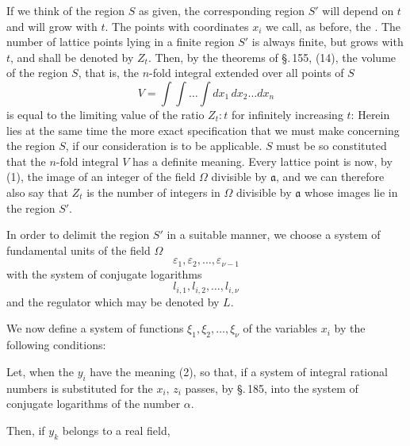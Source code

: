 If we think of the region $S$ as given, the corresponding
 region $S'$ will depend on $t$ and will grow with $t$.
The points with  coordinates $x_i$ we call,
as before, the . The number of lattice points
lying in a finite region $S'$ is always finite,
but grows with $t$, and shall be denoted by $Z_t$. Then, by
the theorems of \S.\,155, (14), the volume of the region $S$, that is, the
$n$-fold integral extended over all points of $S$
\[
V = \int\!\!\int \ldots \int dx_1\, dx_2 \ldots dx_n
\]
is equal to the limiting value of the ratio $Z_t : t$ for infinitely
increasing $t$:
Herein lies at the same time the more exact specification that we must
make concerning the region $S$, if our consideration is to be
 applicable. $S$ must be so constituted that the
$n$-fold integral $V$ has a definite meaning. Every lattice point
 is now, by (1), the image of an integer of the field $\Omega$ divisible
 by $\mathfrak{a}$, and we can therefore also say
that $Z_t$ is the number of integers in $\Omega$ divisible by $\mathfrak{a}$
whose images lie in the region $S'$.

In order to delimit the region $S'$ in a suitable manner, we choose
a system of fundamental units of the field $\Omega$
\[
\varepsilon_1, \varepsilon_2, \ldots, \varepsilon_{\nu-1}
\]
with the system of conjugate logarithms
\[
l_{i,1}, l_{i,2}, \ldots, l_{i,\nu}
\]
and the regulator
which may be denoted by $L$.

We now define a system of functions $\xi_1, \xi_2, \ldots, \xi_\nu$
of the variables $x_i$ by the following conditions:

Let, when the $y_i$ have the meaning (2),
so that, if a system of integral rational numbers is
substituted for the $x_i$, $z_i$ passes, by \S.\,185, into the system of
conjugate logarithms of the number $\alpha$.

Then, if $y_k$ belongs to a real field,

